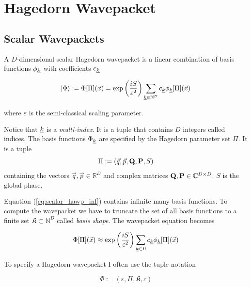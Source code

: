 \documentclass{article}
\begin{document}
\section{Hagedorn Wavepacket}
\subsection{Scalar Wavepackets}
A \(D\)-dimensional scalar Hagedorn wavepacket is a linear combination of basis functions \(\phi_{\underline{k}}\)
with coefficients \(c_{\underline{k}}\)

\begin{equation}
  \label{eq:scalar_hawp_inf}
  \ket{\Phi} := \Phi[\Pi](\vec{x}) = \exp{\left(\frac{iS}{\varepsilon^2}\right)} 
  \sum_{\underline{k} \in \mathbb{N}^D} c_{\underline{k}}\phi_{\underline{k}}[\Pi](\vec{x})
\end{equation}

where \(\varepsilon\) is the semi-classical scaling parameter.\par
Notice that \(\underline{k}\) is a \emph{multi-index}. It is a tuple that
contains \(D\) integers called indices.
The basis functions \(\Phi_{\underline{k}}\) are specified by the
Hagedorn parameter set \(\Pi\). It is a tuple
\[
  \Pi := \left(\vec{q},\vec{p},\mathbf{Q},\mathbf{P},S\right)
\]
containing the vectors \( \vec{q},\vec{p} \in \mathbb{R}^D \) and
complex matrices \( \mathbf{Q},\mathbf{P} \in \mathbb{C}^{D \times D} \). \(S\) is
the global phase.

Equation (\ref{eq:scalar_hawp_inf}) contains infinite many basis functions.
To compute the wavepacket we have to truncate the set of all basis functions to
a finite set \(\mathfrak{K} \subset \mathbb{N}^D\) called \emph{basis shape}.
The wavepacket equation becomes

\[
  \Phi[\Pi](\vec{x}) \approx \exp{\left(\frac{iS}{\varepsilon^2}\right)} 
  \sum_{\underline{k} \in \mathfrak{K}}c_{\underline{k}}\phi_{\underline{k}}[\Pi](\vec{x})
\]

To specify a Hagedorn wavepacket I often use the tuple notation

\[
  \Phi := \left(\varepsilon,\Pi,\mathfrak{K},c\right)
\]
\end{document}
